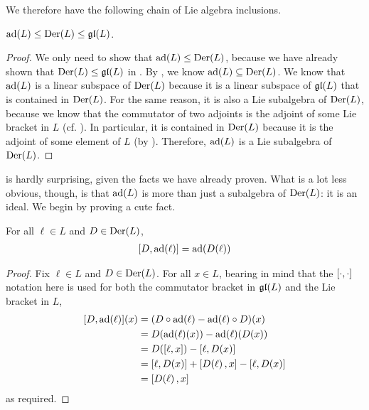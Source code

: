 We therefore have the following chain of Lie algebra inclusions.

\begin{boxlemma}\label{Ch1:Lemma:adSubalgDer}
    $\operatorname{ad}\!\left( L \right) \leq \operatorname{Der}\!\left( L \right) \leq \mathfrak{gl}\!\left( L \right)$.
\end{boxlemma}
\begin{proof}
    We only need to show that $\operatorname{ad}\!\left( L \right) \leq \operatorname{Der}\!\left( L \right)$, because we have already shown that $\operatorname{Der}\!\left( L \right) \leq \mathfrak{gl}\!\left( L \right)$ in . By , we know $\operatorname{ad}\!\left( L \right) \subseteq \operatorname{Der}\!\left( L \right)$. We know that $\operatorname{ad}\!\left( L \right)$ is a linear subspace of $\operatorname{Der}\!\left( L \right)$ because it is a linear subspace of $\mathfrak{gl}\!\left( L \right)$ that is contained in $\operatorname{Der}\!\left( L \right)$. For the same reason, it is also a Lie subalgebra of $\operatorname{Der}\!\left( L \right)$, because we know that the commutator of two adjoints is the adjoint of some Lie bracket in $L$ (cf. ). In particular, it is contained in $\operatorname{Der}\!\left( L \right)$ because it is the adjoint of some element of $L$ (by ). Therefore, $\operatorname{ad}\!\left( L \right)$ is a Lie subalgebra of $\operatorname{Der}\!\left( L \right)$.
\end{proof}

 is hardly surprising, given the facts we have already proven. What is a lot less obvious, though, is that $\operatorname{ad}\!\left( L \right)$ is more than just a subalgebra of $\operatorname{Der}\!\left( L \right)$: it is an ideal. We begin by proving a cute fact.

\begin{boxlemma}\label{Ch1:Lemma:commbrac_der_ad_eq_ad_der}
    For all $\ell \in L$ and $D \in \operatorname{Der}\!\left( L \right)$,
    \begin{align*}
        \left[ D, \operatorname{ad}\!\left( \ell \right) \right] = \operatorname{ad}\!\left( D\!\left( \ell \right) \right)
    \end{align*}
\end{boxlemma}
\begin{proof}
    Fix $\ell \in L$ and $D \in \operatorname{Der}\!\left( L \right)$. For all $x \in L$, bearing in mind that the $\left[ \cdot, \cdot \right]$ notation here is used for both the commutator bracket in $\mathfrak{gl}\!\left( L \right)$ and the Lie bracket in $L$,
    \begin{align*}
        \brac{D, \pad{\ell}}\of{x}
        &= \parenth{D \circ \pad{\ell} - \pad{\ell} \circ D}\of{x} \\
        &= D\of{\pad{\ell}\of{x}} - \pad{\ell}\of{D\of{x}} \\
        &= D\of{\brac{\ell, x}} - \brac{\ell, D\of{x}} \\
        &= \brac{\ell, D\of{x}} + \brac{D\of{\ell}, x} - \brac{\ell, D\of{x}} \\
        &= \brac{D\of{\ell}, x}
    \end{align*}
    as required.
\end{proof}

